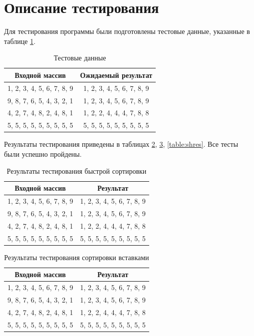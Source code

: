 \section{Описание тестирования}
Для тестирования программы были подготовлены тестовые данные, указанные в таблице \ref{table:test}.

\begin{table}[H]
    \centering
    \caption{Тестовые данные}
    \label{table:test}
    \begin{tabular}{|c|c|}
        \hline
        Входной массив & Ожидаемый результат \\
        \hline
        1, 2, 3, 4, 5, 6, 7, 8, 9 & 1, 2, 3, 4, 5, 6, 7, 8, 9 \\
        \hline
        9, 8, 7, 6, 5, 4, 3, 2, 1 & 1, 2, 3, 4, 5, 6, 7, 8, 9 \\
        \hline
        4, 2, 7, 4, 8, 2, 4, 8, 1 & 1, 2, 2, 4, 4, 4, 7, 8, 8 \\
        \hline
        5, 5, 5, 5, 5, 5, 5, 5, 5 & 5, 5, 5, 5, 5, 5, 5, 5, 5 \\
        \hline
    \end{tabular}
\end{table}

Результаты тестирования приведены в таблицах \ref{table:qsres}, \ref{table:inres}, \ref{table:shres}. Все тесты были успешно пройдены.

\begin{table}[H]
    \centering
    \caption{Результаты тестирования быстрой сортировки}
    \label{table:qsres}
    \begin{tabular}{|c|c|}
        \hline
        Входной массив & Результат \\
        \hline
        1, 2, 3, 4, 5, 6, 7, 8, 9 & 1, 2, 3, 4, 5, 6, 7, 8, 9 \\
        \hline
        9, 8, 7, 6, 5, 4, 3, 2, 1 & 1, 2, 3, 4, 5, 6, 7, 8, 9 \\
        \hline
        4, 2, 7, 4, 8, 2, 4, 8, 1 & 1, 2, 2, 4, 4, 4, 7, 8, 8 \\
        \hline
        5, 5, 5, 5, 5, 5, 5, 5, 5 & 5, 5, 5, 5, 5, 5, 5, 5, 5 \\
        \hline
    \end{tabular}
\end{table}

\begin{table}[H]
    \centering
    \caption{Результаты тестирования сортировки вставками}
    \label{table:inres}
    \begin{tabular}{|c|c|}
        \hline
        Входной массив & Результат \\
        \hline
        1, 2, 3, 4, 5, 6, 7, 8, 9 & 1, 2, 3, 4, 5, 6, 7, 8, 9 \\
        \hline
        9, 8, 7, 6, 5, 4, 3, 2, 1 & 1, 2, 3, 4, 5, 6, 7, 8, 9 \\
        \hline
        4, 2, 7, 4, 8, 2, 4, 8, 1 & 1, 2, 2, 4, 4, 4, 7, 8, 8 \\
        \hline
        5, 5, 5, 5, 5, 5, 5, 5, 5 & 5, 5, 5, 5, 5, 5, 5, 5, 5 \\
        \hline
    \end{tabular}
\end{table}


